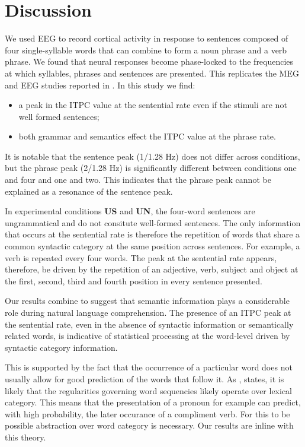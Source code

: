 \documentclass[a4paper,10pt,twoside]{article}
\begin{document}
\section*{Discussion}

We used EEG to record cortical activity in response to sentences
composed of four single-syllable words that can combine to form a noun
phrase and a verb phrase. We found that neural responses become
phase-locked to the frequencies at which syllables, phrases and
sentences are presented. This replicates the MEG and EEG studies
reported in \cite{DingEtAl2015,DingEtAl2017}. In this study we find:
\begin{itemize}
\item a peak in the ITPC value at the sentential rate even if the stimuli are not well formed sentences;
\item both grammar and semantics effect the ITPC value at the phrase rate.  
\end{itemize}
It is notable that the sentence peak (1/1.28 Hz) does not differ
across conditions, but the phrase peak (2/1.28 Hz) is significantly
different between conditions one and four and one and two. This
indicates that the phrase peak cannot be explained as a resonance of
the sentence peak.


In experimental conditions \textbf{US} and \textbf{UN}, the four-word
sentences are ungrammatical and do not consitute well-formed
sentences. The only information that occurs at the sentential rate is
therefore the repetition of words that share a common syntactic
category at the same position across sentences. For example, a verb is
repeated every four words. The peak at the sentential rate appears,
therefore, be driven by the repetition of an adjective, verb, subject
and object at the first, second, third and fourth position in every
sentence presented.

Our results combine to suggest that semantic information plays a
considerable role during natural language comprehension. The presence
of an ITPC peak at the sentential rate, even in the absence of
syntactic information or semantically related words, is indicative of
statistical processing at the word-level driven by syntactic category
information.

This is supported by the fact that the occurrence of a particular word
does not usually allow for good prediction of the words that follow
it. As \cite{Pulvermuller2002}, states, it is likely that the regularities
governing word sequencies likely operate over lexical category. This
means that the presentation of a pronoun for example can predict, with
high probability, the later occurance of a compliment verb. For this
to be possible abstraction over word category is necessary. Our
results are inline with this theory.
\end{document}
